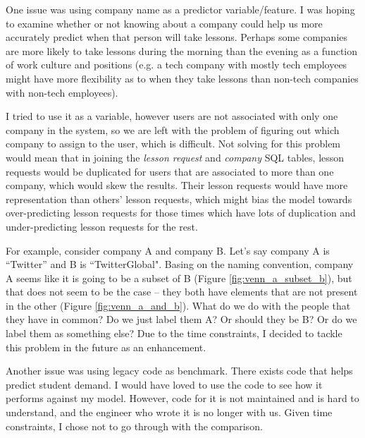 \documentclass[oneside]{article}
\begin{document}
One issue was using company name as a predictor variable/feature.  I was hoping
to examine whether or not knowing about a company could help us more accurately
predict when that person will take lessons.  Perhaps some companies are more
likely to take lessons during the morning than the evening as a function of
work culture and positions (e.g. a tech company with mostly tech employees
might have more flexibility as to when they take lessons than non-tech
companies with non-tech employees).

I tried to use it as a variable, however users are not associated with only one
company in the system, so we are left with the problem of figuring out which
company to assign to the user, which is difficult. Not solving for this problem
would mean that in joining the \emph{lesson request} and \emph{company} SQL
tables, lesson requests would be duplicated for users that are associated to
more than one company, which would skew the results. Their lesson requests
would have more representation than others' lesson requests, which might bias
the model towards over-predicting lesson requests for those times which have
lots of duplication and under-predicting lesson requests for the rest.

For example, consider company A and company B. Let's say company A is
``Twitter'' and B is ``TwitterGlobal". Basing on the naming convention, company
A seems like it is going to be a subset of B (Figure
\ref{fig:venn_a_subset_b}), but that does not seem to be the case -- they both
have elements that are not present in the other (Figure
\ref{fig:venn_a_and_b}).  What do we do with the people that they have in
common? Do we just label them A? Or should they be B? Or do we label them as
something else? Due to the time constraints, I decided to tackle this
problem in the future as an enhancement.

Another issue was using legacy code as benchmark. There exists code that helps
predict student demand. I would have loved to use the code to see how it
performs against my model. However, code for it is not maintained and is hard
to understand, and the engineer who wrote it is no longer with us. Given time
constraints, I chose not to go through with the comparison.
\end{document}
